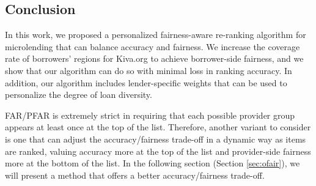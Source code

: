 \subsection{Conclusion}
\label{subsect:far_conclusion}

In this work, we proposed a personalized fairness-aware re-ranking algorithm for microlending that can balance accuracy and fairness. We increase the coverage rate of borrowers' regions for Kiva.org to achieve borrower-side fairness, and we show that our algorithm can do so with minimal loss in ranking accuracy. In addition, our algorithm includes lender-specific weights that can be used to personalize the degree of loan diversity.



FAR/PFAR is extremely strict in requiring that each possible provider group appears at least once at the top of the list. Therefore, another variant to consider is one that can adjust the accuracy/fairness trade-off in a dynamic way as items are ranked, valuing accuracy more at the top of the list and provider-side fairness more at the bottom of the list. In the following section (Section \ref{sec:ofair}), we will present a method that offers a better accuracy/fairness trade-off.



